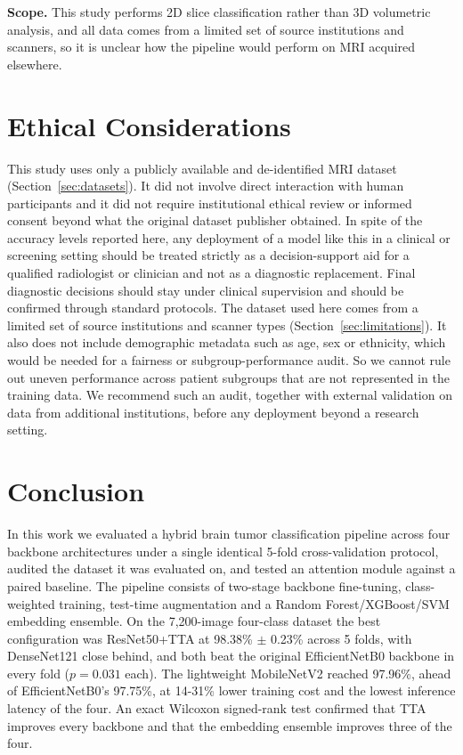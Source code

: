 \documentclass[11pt]{article}
\begin{document}
\textbf{Scope.} This study performs 2D slice classification rather than 3D volumetric analysis, and all data comes from a limited set of source institutions and scanners, so it is unclear how the pipeline would perform on MRI acquired elsewhere.

\section{Ethical Considerations}
\label{sec:ethics}
This study uses only a publicly available and de-identified MRI dataset (Section~\ref{sec:datasets}). It did not involve direct interaction with human participants and it did not require institutional ethical review or informed consent beyond what the original dataset publisher obtained. In spite of the accuracy levels reported here, any deployment of a model like this in a clinical or screening setting should be treated strictly as a decision-support aid for a qualified radiologist or clinician and not as a diagnostic replacement. Final diagnostic decisions should stay under clinical supervision and should be confirmed through standard protocols. The dataset used here comes from a limited set of source institutions and scanner types (Section~\ref{sec:limitations}). It also does not include demographic metadata such as age, sex or ethnicity, which would be needed for a fairness or subgroup-performance audit. So we cannot rule out uneven performance across patient subgroups that are not represented in the training data. We recommend such an audit, together with external validation on data from additional institutions, before any deployment beyond a research setting.


\section{Conclusion}
\label{sec:conclusion}
In this work we evaluated a hybrid brain tumor classification pipeline across four backbone architectures under a single identical 5-fold cross-validation protocol, audited the dataset it was evaluated on, and tested an attention module against a paired baseline. The pipeline consists of two-stage backbone fine-tuning, class-weighted training, test-time augmentation and a Random Forest/XGBoost/SVM embedding ensemble. On the 7,200-image four-class dataset the best configuration was ResNet50+TTA at 98.38\% $\pm$ 0.23\% across 5 folds, with DenseNet121 close behind, and both beat the original EfficientNetB0 backbone in every fold ($p=0.031$ each). The lightweight MobileNetV2 reached 97.96\%, ahead of EfficientNetB0's 97.75\%, at 14-31\% lower training cost and the lowest inference latency of the four. An exact Wilcoxon signed-rank test confirmed that TTA improves every backbone and that the embedding ensemble improves three of the four.
\end{document}
